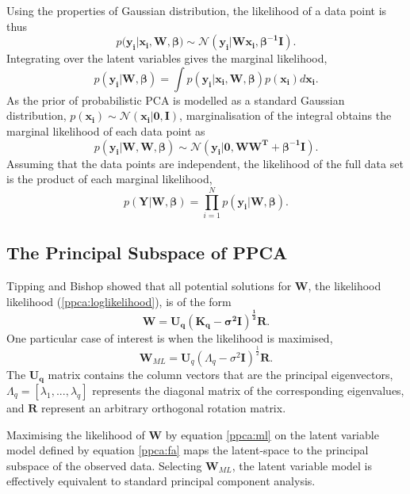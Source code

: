 \documentclass[ %
                    author={Dillon Keith Diep [INCOMPLETE DRAFT, NOT FOR SUBMISSION]},
                supervisor={Dr. Carl Henrik Ek},
                    degree={MEng},
                     title={ART-CG:},
                  subtitle={Assisted Real-Time Content Generation of 3D Hair Geometry},
                      type={Research},
                      year={2014} ]{dissertation}
\begin{document}
Using the properties of Gaussian distribution, the likelihood of a data point is thus
\begin{equation} \label{ppca:likelihood}
p(\mathbf{y_i|x_i,W,\beta)\sim\mathcal{N}(y_i|Wx_i,\beta^{-1}I)}.
\end{equation}
Integrating over the latent variables gives the marginal likelihood,
$$p(\mathbf{y_i|W,\beta})=\int p(\mathbf{y_i|x_i,W,\beta})p(\mathbf{x_i})d\mathbf{x_i}.$$
As the prior of probabilistic PCA is modelled as a standard Gaussian distribution, $p(\mathbf{x_i})\sim\mathcal{N}(\mathbf{x_i|0,I})$,
marginalisation of the integral obtains the marginal likelihood of each data point as
$$p(\mathbf{y_i|W,W,\beta})\sim\mathcal{N}(\mathbf{y_i|0,WW^T+\beta^{-1}I}).$$
Assuming that the data points are independent, the likelihood of the full data set is the product of each marginal likelihood,
$$p(\mathbf{Y|W,\beta})=\prod^N_{i=1} p(\mathbf{y_i|W,\beta}).$$

\subsection{The Principal Subspace of PPCA}
Tipping and Bishop\cite{ppca} showed that all potential solutions for $\mathbf{W}$, the likelihood likelihood (\ref{ppca:loglikelihood}), is of the form $$\mathbf{W=U_q(K_q-\sigma^2I)^\frac{1}{2}R}.$$
One particular case of interest is when the likelihood is maximised,
\begin{equation} \label{ppca:ml}
	\mathbf{W}_{ML}=\mathbf{U}_q(\Lambda_q-\sigma^2\mathbf{I})^{\frac{1}{2}}\mathbf{R}.
\end{equation}
The $\mathbf{U_q}$ matrix contains the column vectors that are the principal eigenvectors, $\Lambda_q=[\lambda_1,...,\lambda_q]$ represents the diagonal matrix of the corresponding eigenvalues, and $\mathbf{R}$ represent an arbitrary orthogonal rotation matrix. 

Maximising the likelihood of $\mathbf{W}$ by equation \ref{ppca:ml} on the latent variable model defined by equation \ref{ppca:fa} maps the latent-space to the principal subspace of the observed data. Selecting $\mathbf{W}_{ML}$, the latent variable model is effectively equivalent to standard principal component analysis.
\end{document}
